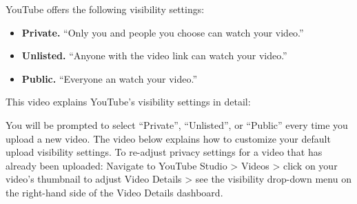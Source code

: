 YouTube offers the following visibility settings:

\begin{itemize}
        \item \textbf{Private.} ``Only you and people you choose can watch your video.''
        \item \textbf{Unlisted.} ``Anyone with the video link can watch your video.''
        \item \textbf{Public.} ``Everyone an watch your video.''
    \end{itemize}

This video explains YouTube's visibility settings in detail:


\begin{gram}
    You will be prompted to select ``Private'', ``Unlisted'', or ``Public'' every time you upload a new video.
    The video below explains how to customize your default upload visibility settings.
    To re-adjust privacy settings for a video that has already been uploaded: Navigate to YouTube Studio > Videos > click on your video's thumbnail to adjust Video Details > see the visibility drop-down menu on the right-hand side of the Video Details dashboard.

\end{gram}

